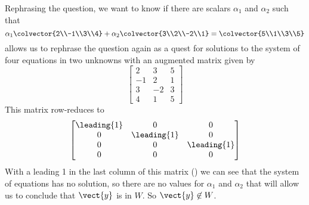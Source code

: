 Rephrasing the question, we want to know if there are scalars $\alpha_1$ and $\alpha_2$ such that
%
\begin{equation*}
\alpha_1\colvector{2\\-1\\3\\4}+\alpha_2\colvector{3\\2\\-2\\1}=\colvector{5\\1\\3\\5}
\end{equation*}
%
 allows us to rephrase the question again as a quest for solutions to the system of four equations in two unknowns with an augmented matrix given by
%
\begin{equation*}
\begin{bmatrix}
2 & 3 & 5\\
-1 & 2 & 1\\
3 & -2 & 3\\
4 &  1 & 5
\end{bmatrix}
\end{equation*}
%
This matrix row-reduces to
%
\begin{equation*}
\begin{bmatrix}
\leading{1} & 0 & 0\\
0 & \leading{1} & 0\\ 
0 & 0 & \leading{1}\\ 
0 & 0 & 0
\end{bmatrix}
\end{equation*}
%
With a leading 1 in the last column of this matrix ()  we can see that the system of equations has no solution, so there are no values for $\alpha_1$ and $\alpha_2$ that will allow us to conclude that $\vect{y}$ is in $W$.  So $\vect{y}\not\in W$.
